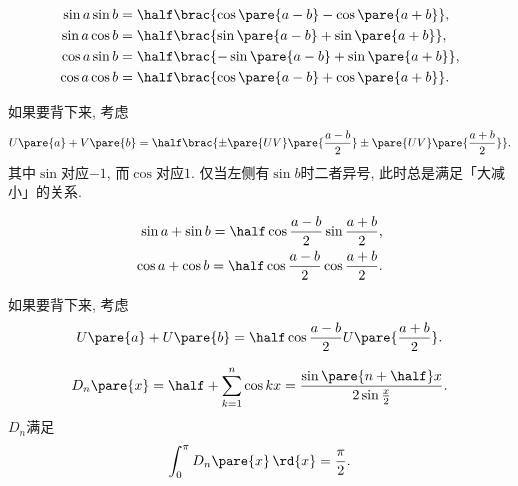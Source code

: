 \documentclass[hidelinks]{ctexart}
\begin{document}
\begin{finale}
    \begin{theorem}
        \begin{align*}
            \sin a\sin b &= \half\brac{\cos\pare{a-b}-\cos\pare{a+b}},\\
            \sin a\cos b &= \half\brac{\sin\pare{a-b}+\sin\pare{a+b}},\\
            \cos a\sin b &= \half\brac{-\sin\pare{a-b}+\sin\pare{a+b}},\\
            \cos a\cos b &= \half\brac{\cos\pare{a-b}+\cos\pare{a+b}}.
        \end{align*}
    \end{theorem}
    \begin{remark}
        如果要背下来, 考虑
        \[ U\pare{a} + V\pare{b} = \half\brac{\pm\pare{UV}\pare{\frac{a-b}{2}}\pm\pare{UV}\pare{\frac{a+b}{2}}}. \]
        其中$\sin$对应$-1$, 而$\cos$对应$1$. 仅当左侧有$\sin b$时二者异号, 此时总是满足「大减小」的关系.
    \end{remark}
    \begin{theorem}
        \begin{align*}
            \sin a + \sin b = \half \cos \frac{a-b}{2} \sin \frac{a+b}{2},\\
            \cos a + \cos b = \half \cos \frac{a-b}{2} \cos \frac{a+b}{2}.
        \end{align*}
        \begin{remark}
            如果要背下来, 考虑
            \[ {U}\pare{a} + {U}\pare{b} = \half \cos \frac{a-b}{2}{U}\pare{\frac{a+b}{2}}. \]
        \end{remark}
    \end{theorem}
\end{finale}
\begin{finale}
    \begin{definition}[Dirichlet核]
        \[ D_n\pare{x} = \half + \sum_{k=1}^n \cos kx = \frac{\sin\pare{n+\half}x}{2\sin\frac{x}{2}}. \]
        $D_n$满足
        \[ \int_0^\pi D_n\pare{x}\,\rd{x} = \frac{\pi}{2}. \]
    \end{definition}
\end{finale}
\end{document}
